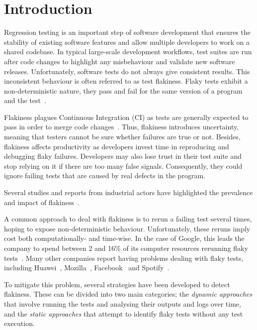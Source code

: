 \section{Introduction}
\label{sec:replication-introduction}

Regression testing is an important step of software development that ensures the stability of existing software features and allow multiple developers to work on a shared codebase.  
In typical large-scale development workflows, test suites are run after code changes to highlight any misbehaviour and validate new software releases. 
Unfortunately, software tests do not always give consistent results. This inconsistent behaviour is often referred to as test flakiness. Flaky tests exhibit a non-deterministic nature, \ie they pass and fail for the same version of a program and the test~\cite{Luo2014}.

Flakiness plagues Continuous Integration (CI) as tests are generally expected to pass in order to merge code changes~\cite{CI}. Thus, flakiness introduces uncertainty, meaning that testers cannot be sure whether failures are true or not. 
Besides, flakiness affects productivity as developers invest time in reproducing and debugging flaky failures. 
Developers may also lose trust in their test suite and stop relying on it if there are too many false signals. 
Consequently, they could ignore failing tests that are caused by real defects in the program.

Several studies and reports from industrial actors have highlighted the prevalence and impact of flakiness~\cite{Lam2019RootCausing, LeongSPTM19, Kowalczyk2020}.  

A common approach to deal with flakiness is to rerun a failing test several times, hoping to expose non-deterministic behaviour. Unfortunately, these reruns imply cost both computationally- and time-wise. In the case of Google, this leads the company to spend between 2 and 16\% of its computer resources rerunning flaky tests~\cite{Micco2017}. Many other companies report having problems dealing with flaky tests, including Huawei~\cite{JiangHuawei}, Mozilla~\cite{Mozilla}, Facebook~\cite{Harman2018} and Spotify~\cite{FlakinessSpotify}.

To mitigate this problem, several strategies have been developed to detect flakiness. These can be divided into two main categories; the \textit{dynamic approaches} that involve running the tests and analysing their outputs and logs over time, and the \textit{static approaches} that attempt to identify flaky tests without any test execution. 

